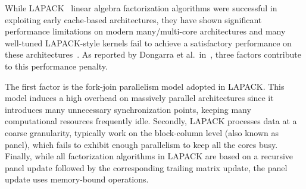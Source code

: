 While LAPACK~\cite{anderson1999lapack} linear algebra factorization
algorithms were successful in exploiting early cache-based
architectures, they have shown significant performance
limitations on modern many/multi-core architectures and many
well-tuned LAPACK-style kernels
fail to achieve a satisfactory performance on these
architectures~\cite{agullo2009comparative}.
As reported by Dongarra et al\@.~in~\cite{dongarra2011achieving},
three factors contribute to this
performance penalty.

The first factor is the fork-join parallelism
model adopted in LAPACK. This model induces a high overhead on
massively parallel architectures since it introduces many unnecessary
synchronization points, keeping many computational resources frequently
idle.
Secondly, LAPACK processes data at a coarse granularity,
typically work on the block-column level (also known as panel),
which fails to exhibit enough parallelism to
keep all the cores busy.
Finally, while all factorization algorithms in LAPACK are based on
a recursive panel update followed by the corresponding trailing
matrix update, the panel update uses memory-bound operations.

